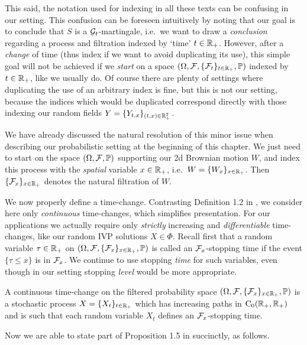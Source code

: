 This said, the notation used for indexing in all these texts can be confusing in our setting. This confusion can be foreseen intuitively by noting that our goal is to conclude that $S$ is a $\mathcal{G}_t$-martingale, i.e.~we want to draw a \emph{conclusion} regarding a process and filtration indexed by `time' $t\in\mathbb{R}_+$. However, after a \emph{change} of time (thus index if we want to avoid duplicating its use), this simple goal will not be achieved if we \emph{start} on a space $(\Omega,\mathcal{F},\{\mathcal{F}_t\}_{t\in\mathbb{R}_+},\mathbb{P})$ indexed by $t\in\mathbb{R}_+$, like we usually do. Of course there are plenty of settings where duplicating the use of an arbitrary index is fine, but this is not our setting, because the indices which would be duplicated correspond directly with those indexing our random fields $Y=\{Y_{t,x}\}_{(t,x)\in\mathbb{R}_+^2}$.

We have already discussed the natural resolution of this minor issue when describing our probabilistic setting at the beginning of this chapter. We just need to start on the space $(\Omega,\mathcal{F},\mathbb{P})$ supporting our 2d Brownian motion $W$, and index this process with the \emph{spatial} variable $x\in\mathbb{R}_+$, i.e.~$W=\{W_x\}_{x\in\mathbb{R}_+}$. Then $\{\mathcal{F}_x\}_{x\in\mathbb{R}_+}$ denotes the natural filtration of $W$.

We now properly define a time-change. Contrasting Definition 1.2 in \cite{revuz_1999}, we consider here only \emph{continuous} time-changes, which simplifies presentation. For our applications we actually require only \emph{strictly} increasing and \emph{differentiable} time-changes, like our random IVP solutions $X\in\Phi$. Recall first that a random variable $\tau\in\mathbb{R}_+$ on $(\Omega,\mathcal{F},\{\mathcal{F}_x\}_{x\in\mathbb{R}_+},\mathbb{P})$ is called an $\mathcal{F}_x$-stopping time if the event $\{\tau\le x\}$ is in $\mathcal{F}_x$. We continue to use stopping \emph{time} for such variables, even though in our setting stopping \emph{level} would be more appropriate.

\begin{definition}\label{def:time_change}
    A continuous time-change on the filtered probability space $(\Omega,\mathcal{F},\{\mathcal{F}_x\}_{x\in\mathbb{R}_+},\mathbb{P})$ is a stochastic process $X=\{X_t\}_{t\in\mathbb{R}_+}$ which has increasing paths in $\mathrm{C}_0(\mathbb{R}_+,\mathbb{R}_+)$ and is such that each random variable $X_t$ defines an $\mathcal{F}_x$-stopping time.
\end{definition}

Now we are able to state part of Proposition 1.5 in \cite{revuz_1999} succinctly, as follows.

